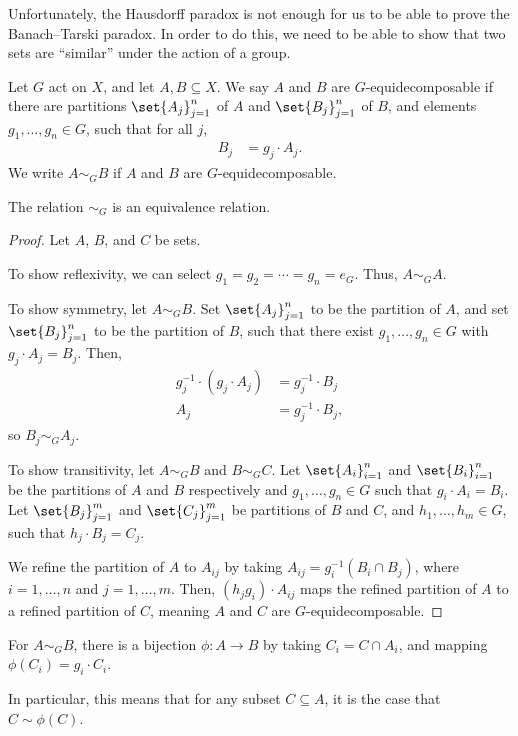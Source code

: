 Unfortunately, the Hausdorff paradox is not enough for us to be able to prove the Banach--Tarski paradox. In order to do this, we need to be able to show that two sets are ``similar'' under the action of a group.
\begin{definition}
  Let $G$ act on $X$, and let $A,B\subseteq X$. We say $A$ and $B$ are $G$-{equidecomposable} if there are partitions $\set{A_j}_{j=1}^{n}$ of $A$ and $\set{B_j}_{j=1}^{n}$ of $B$, and elements $g_1,\dots,g_n\in G$, such that for all $j$,
  \begin{align*}
    B_j &= g_j\cdot A_j.
  \end{align*}
  We write $A\sim_{G}B$ if $A$ and $B$ are $G$-equidecomposable.
\end{definition}
\begin{fact}
  The relation $\sim_{G}$ is an equivalence relation.
\end{fact}
\begin{proof}
  Let $A$, $B$, and $C$ be sets.\newline

  To show reflexivity, we can select $g_1 = g_2 = \cdots = g_n = e_G$. Thus, $A\sim_{G}A$.\newline

  To show symmetry, let $A\sim_{G} B$. Set $\set{A_j}_{j=1}^{n}$ to be the partition of $A$, and set $\set{B_j}_{j=1}^{n}$ to be the partition of $B$, such that there exist $g_1,\dots,g_n\in G$ with $g_j\cdot A_j = B_j$. Then,
  \begin{align*}
    g_j^{-1}\cdot \left(g_j\cdot A_j\right) &= g_j^{-1}\cdot B_j\\
    A_j &= g_j^{-1}\cdot B_j,
  \end{align*}
  so $B_j\sim_{G}A_j$.\newline

  To show transitivity, let $A\sim_{G} B$ and $B\sim_{G} C$. Let $\set{A_i}_{i=1}^{n}$ and $\set{B_i}_{i=1}^{n}$ be the partitions of $A$ and $B$ respectively and $g_1,\dots,g_n\in G$ such that $g_i\cdot A_i = B_i$. Let $\set{B_j}_{j=1}^{m}$ and $\set{C_j}_{j=1}^{m}$ be partitions of $B$ and $C$, and $h_1,\dots,h_m\in G$, such that $h_j\cdot B_j = C_j$.\newline

  We refine the partition of $A$ to $A_{ij}$ by taking $A_{ij} = g_i^{-1}\left(B_{i}\cap B_j\right)$, where $i = 1,\dots,n$ and $j = 1,\dots,m$. Then, $\left(h_jg_i\right)\cdot A_{ij}$ maps the refined partition of $A$ to a refined partition of $C$, meaning $A$ and $C$ are $G$-equidecomposable.
\end{proof}
\begin{fact}
  For $A\sim_{G} B$, there is a bijection $\phi\colon A\rightarrow B$ by taking $C_{i} = C\cap A_i$, and mapping $\phi\left(C_i\right) = g_i\cdot C_i$.\newline

  In particular, this means that for any subset $C\subseteq A$, it is the case that $C\sim \phi(C)$.\label{fact:bijections}
\end{fact}


